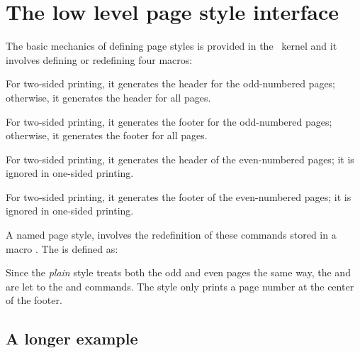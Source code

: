 \section{The low level page style interface}

The basic mechanics of defining page styles is provided in the \LaTeXe\ kernel and it  involves defining or redefining four macros:

\begin{marglist}
\item [\docAuxCommand{oddhead}] For two-sided printing, it generates the header for the odd-numbered
pages; otherwise, it generates the header for all pages.

\item [\cs{oddfoot}] For two-sided printing, it generates the footer for the odd-numbered pages; otherwise, it generates the footer for all pages.

\item [\cs{evenhead}] For two-sided printing, it generates the header of the even-numbered
pages; it is ignored in one-sided printing.

\item [\cs{evenfoot}] For two-sided printing, it generates the footer of the even-numbered
pages; it is ignored in one-sided printing.

\end{marglist}
A named page style, involves the redefinition of these commands stored in a macro .
The  is defined as:




Since the \textit{plain} style treats both the odd and even pages the same way, the  and  are let to the  and  commands. The style only prints a page number at the center of the footer.


\subsection{A longer example}

